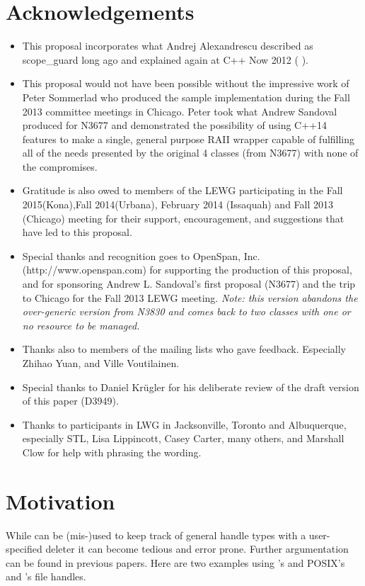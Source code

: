 \documentclass[ebook,11pt,article]{memoir}
\begin{document}
\chapter{Acknowledgements}
\begin{itemize}
\item This proposal incorporates what Andrej Alexandrescu described as scope_guard long ago and explained again at C++ Now 2012 (%
).
\item This proposal would not have been possible without the impressive work of Peter Sommerlad who produced the sample implementation during the Fall 2013 committee meetings in Chicago.  Peter took what Andrew Sandoval produced for N3677 and demonstrated the possibility of using C++14 features to make a single, general purpose RAII wrapper capable of fulfilling all of the needs presented by the original 4 classes (from N3677) with none of the compromises.
\item Gratitude is also owed to members of the LEWG participating in the Fall 2015(Kona),Fall 2014(Urbana), February 2014 (Issaquah) and Fall 2013 (Chicago) meeting for their support, encouragement, and suggestions that have led to this proposal.
\item Special thanks and recognition goes to OpenSpan, Inc. (http://www.openspan.com) for supporting the production of this proposal, and for sponsoring Andrew L. Sandoval's first proposal (N3677) and the trip to Chicago for the Fall 2013 LEWG meeting. \emph{Note: this version abandons the over-generic version from N3830 and comes back to two classes with one or no resource to be managed.}
\item Thanks also to members of the mailing lists who gave feedback. Especially Zhihao Yuan, and Ville Voutilainen.
\item Special thanks to Daniel Kr\"ugler for his deliberate review of the draft version of this paper (D3949).
\item Thanks to participants in LWG in Jacksonville, Toronto and Albuquerque, especially STL, Lisa Lippincott, Casey Carter, many others, and Marshall Clow for help with phrasing the wording.
\end{itemize}
\newpage
\chapter{Motivation}
While  can be (mis-)used to keep track of general handle types with a user-specified deleter it can become tedious and error prone. Further argumentation can be found in previous papers. Here are two examples using  's  and POSIX's and 's  file handles. 
\end{document}
